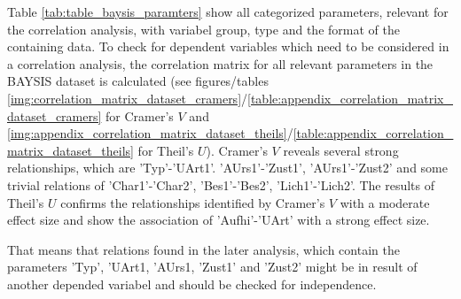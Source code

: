 \documentclass[a4paper,headsepline,footsepline,fontsize=11pt,BCOR=12mm,DIV=12]{report}
\begin{document}
Table \ref{tab:table_baysis_paramters} show all categorized parameters, relevant for the correlation analysis, with variabel group, type and the format of the containing data. To check for dependent variables which need to be considered in a correlation analysis, the correlation matrix for all relevant parameters in the BAYSIS dataset is calculated (see figures/tables \ref{img:correlation_matrix_dataset_cramers}/\ref{table:appendix_correlation_matrix_dataset_cramers} for Cramer's $V$ and \ref{img:appendix_correlation_matrix_dataset_theils}/\ref{table:appendix_correlation_matrix_dataset_theils} for Theil's $U$). Cramer's $V$ reveals several strong relationships, which are 'Typ'-'UArt1'. 'AUrs1'-'Zust1', 'AUrs1'-'Zust2' and some  trivial relations of 'Char1'-'Char2', 'Bes1'-'Bes2', 'Lich1'-'Lich2'. The results of Theil's $U$ confirms the relationships identified by Cramer's $V$ with a moderate effect size and show the association of 'Aufhi'-'UArt' with a strong effect size. 


That means that relations found in the later analysis, which contain the parameters 'Typ', 'UArt1, 'AUrs1, 'Zust1' and 'Zust2' might be in result of another depended variabel and should be checked for independence.
\end{document}
